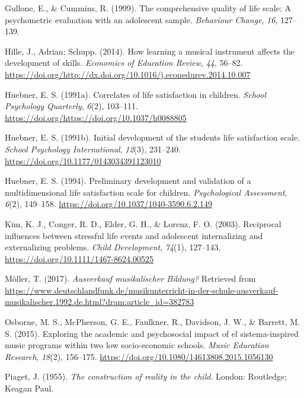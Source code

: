 \documentclass[a4, 12pt]{article}
\begin{document}
\leavevmode\hypertarget{ref-Gullone1999}{}%
Gullone, E., \& Cummins, R. (1999). The comprehensive quality of life scale: A psychometric evaluation with an adolescent sample. \emph{Behaviour Change}, \emph{16}, 127--139.

\leavevmode\hypertarget{ref-Hille2014}{}%
Hille, J., Adrian; Schupp. (2014). How learning a musical instrument affects the development of skills. \emph{Economics of Education Review}, \emph{44}, 56--82. \url{https://doi.org/http://dx.doi.org/10.1016/j.econedurev.2014.10.007}

\leavevmode\hypertarget{ref-Huebner1991}{}%
Huebner, E. S. (1991a). Correlates of life satisfaction in children. \emph{School Psychology Quarterly}, \emph{6}(2), 103--111. \url{https://doi.org/https://doi.org/10.1037/h0088805}

\leavevmode\hypertarget{ref-Huebner1991a}{}%
Huebner, E. S. (1991b). Initial development of the students life satisfaction scale. \emph{School Psychology International}, \emph{12}(3), 231--240. \url{https://doi.org/10.1177/0143034391123010}

\leavevmode\hypertarget{ref-Huebner1994}{}%
Huebner, E. S. (1994). Preliminary development and validation of a multidimensional life satisfaction scale for children. \emph{Psychological Assessment}, \emph{6}(2), 149--158. \url{https://doi.org/10.1037/1040-3590.6.2.149}

\leavevmode\hypertarget{ref-Kim2003}{}%
Kim, K. J., Conger, R. D., Elder, G. H., \& Lorenz, F. O. (2003). Reciprocal influences between stressful life events and adolescent internalizing and externalizing problems. \emph{Child Development}, \emph{74}(1), 127--143. \url{https://doi.org/10.1111/1467-8624.00525}

\leavevmode\hypertarget{ref-Moeller2017}{}%
Möller, T. (2017). \emph{Ausverkauf musikalischer Bildung?} Retrieved from \url{https://www.deutschlandfunk.de/musikunterricht-in-der-schule-ausverkauf-musikalischer.1992.de.html?dram:article_id=382783}

\leavevmode\hypertarget{ref-Osborne2015}{}%
Osborne, M. S., McPherson, G. E., Faulkner, R., Davidson, J. W., \& Barrett, M. S. (2015). Exploring the academic and psychosocial impact of el sistema-inspired music programs within two low socio-economic schools. \emph{Music Education Research}, \emph{18}(2), 156--175. \url{https://doi.org/10.1080/14613808.2015.1056130}

\leavevmode\hypertarget{ref-Piaget1955}{}%
Piaget, J. (1955). \emph{The construction of reality in the child}. London: Routledge; Keagan Paul.
\end{document}
